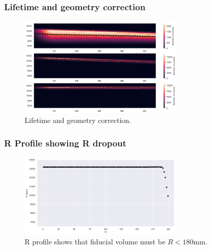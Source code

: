 \begin{frame}
\frametitle{Lifetime and geometry correction}
\begin{figure}
  \begin{center}
      \includegraphics[width=0.7\textwidth]{img/r6581/CorrectionLT.png}
    \caption{Lifetime and geometry correction.}
  \end{center}
\end{figure}
\end{frame}

\begin{frame}
\frametitle{R Profile showing R dropout}
\begin{figure}
  \begin{center}
      \includegraphics[width=0.7\textwidth]{img/r6581/RProfile.png}
    \caption{R profile shows that fiducial volume must be $R < 180$mm.}
  \end{center}
\end{figure}
\end{frame}


